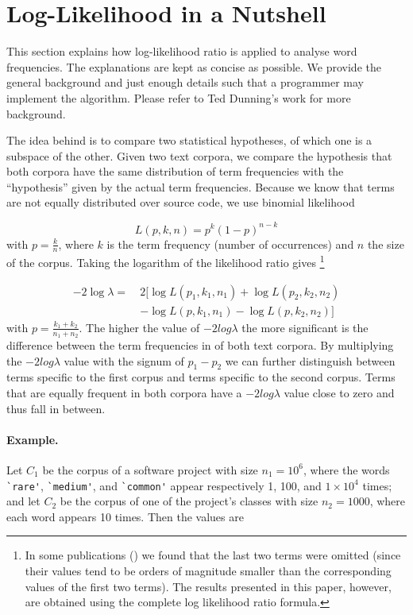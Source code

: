 \section{Log-Likelihood in a Nutshell}\label{nutshell}

This section explains how log-likelihood ratio is applied to analyse word frequencies. The explanations are kept as concise as possible. We provide the general background and just enough details such that a programmer may implement the algorithm. Please refer to Ted Dunning's work \cite{Dunning} for more background.

The idea behind \loglr is to compare two statistical hypotheses, of which one is a subspace of the other. Given two text corpora, we compare the hypothesis that both corpora have the same distribution of term frequencies with the ``hypothesis'' given by the actual term frequencies. Because we know that terms are not equally distributed over source code, we use binomial likelihood

$$ L(p,k,n) = p^k ( 1 - p) ^ { n - k }$$
\noindent
with $p = \frac{k}{n}$, where $k$ is the term frequency (\ie number of occurrences) and $n$ the size of the corpus. Taking the logarithm of the likelihood ratio gives
\footnote{In some publications (\eg \cite{Rayson}) we found that the last two terms were omitted (since their values tend to be orders of magnitude smaller than the corresponding values of the first two terms). The results presented in this paper, however, are obtained using the complete log likelihood ratio formula.}

\begin{align*}
-2 \log \lambda =~&2 \big[ \log L(p_1,k_1,n_1) + \log L(p_2,k_2,n_2)\\
 &- \log L(p,k_1,n_1) - \log L(p,k_2,n_2) \big] 
\end{align*}
\noindent
with $p = \frac{k_1 + k_2}{n_1 + n_2}$. The higher the value of $-2log\lambda$ the more significant is the difference between the term frequencies in of both text corpora. By multiplying the $-2log\lambda$ value with the signum of $p_1 - p_2$ we can further distinguish between terms specific to the first corpus and terms specific to the second corpus. Terms that are equally frequent in both corpora have a $-2log\lambda$ value close to zero and thus fall in between.

\paragraph{Example.} Let $C_1$ be the corpus of a software project with size $n_1 = 10^6$, where the words \verb$`rare'$, \verb$`medium'$, and \verb$`common'$ appear respectively 1, 100, and $1\times10^4$ times; and let $C_2$ be the corpus of one of the project's classes with size $n_2 = 1000$, where each word appears 10 times. Then the \loglr{} values are

